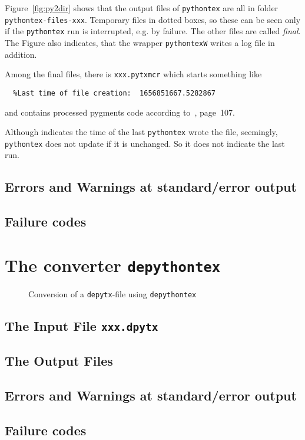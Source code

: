 \documentclass[10pt]{article}
\newcommand{\pytex}{\texttt{pythontex}}
\newcommand{\dpytex}{\texttt{depythontex}}
\begin{document}
  Figure~\ref{fig:py2dir} shows that the output files of \pytex{} 
  are all in folder \texttt{pythontex-files-xxx}. 
  Temporary files in dotted boxes, 
  so these can be seen only if the \pytex{} run is interrupted, e.g. by failure. 
  The other files are called {\em final}. 
  The Figure also indicates, that the wrapper \texttt{pythontexW} writes a log file in addition. 
  
  Among the final files, there is \texttt{xxx.pytxmcr} 
  which starts something like 

\begin{lstlisting}
  %Last time of file creation:  1656851667.5282867
\end{lstlisting}

and contains processed pygments code according to~\cite{PythonTexP}, page~107. 

  Although indicates the time of the last \pytex{} wrote the file, 
  seemingly, \pytex{} does not update if it is unchanged. 
  So it does not indicate the last run. %


\subsection{Errors and Warnings at standard/error output}\label{subsec:pytexErrWarn}

\subsection{Failure codes}\label{subsec:pytexFCodes}

\section{The converter \dpytex}\label{sec:dpytex}

\begin{figure}[htb]
  \centering
  \caption{\label{fig:depy2out}Conversion of a \texttt{depytx}-file using \texttt{depythontex}}
  \end{figure}


\subsection{The Input File \texttt{xxx.dpytx}}\label{subsec:dpytexInFile}

\subsection{The Output Files}\label{subsec:dpytexOutFile}

\subsection{Errors and Warnings at standard/error output}\label{subsec:dpytexErrWarn}

\subsection{Failure codes}\label{subsec:dpytexFCodes}



{}%
\end{document}
